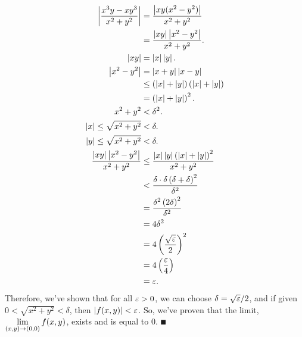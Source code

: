 \documentclass[a4paper, 11pt]{report}
\begin{document}
\begin{align*}
	\left| \frac{x^3y - xy^3}{x^2 + y^2} \right| &= \frac{\left| xy(x^2 - y^2) \right|}{x^2 + y^2} \\
		&= \frac{\left| xy \right|\left| x^2 - y^2 \right|}{x^2 + y^2}. \\
	\left| xy \right| &= \left| x \right|\left| y \right|. \\
	\left| x^2 - y^2 \right| &= \left| x + y \right|\left| x-y \right| \\
		&\leq \left( \left| x \right| + \left| y \right| \right)\left( \left| x \right| + \left| y \right| \right) \\
		&= \left( \left| x \right| + \left| y \right| \right)^2. \\
	x^2 + y^2 &< \delta^2. \\
	\left| x \right| \leq \sqrt{x^2 + y^2} &< \delta. \\
	\left| y \right| \leq \sqrt{x^2 + y^2} &< \delta. \\
	\frac{\left| xy \right|\left| x^2 - y^2 \right|}{x^2 + y^2} &\leq \frac{\left| x \right|\left| y \right|\left( \left| x \right| + \left| y \right| \right)^2}{x^2 + y^2} \\
		&< \frac{\delta\cdot\delta\left( \delta + \delta \right)^2}{\delta^2} \\
		&= \frac{\delta^2\left( 2\delta \right)^2}{\delta^2} \\
		&= 4\delta^2 \\
		&= 4\left( \frac{\sqrt{\varepsilon}}{2} \right)^2 \\
		&= 4\left( \frac{\varepsilon}{4} \right) \\
		&= \varepsilon.
\end{align*}
Therefore, we've shown that for all $\varepsilon>0$, we can choose $\delta=\sqrt{\varepsilon}/2$, and if given $0 < \sqrt{x^2+y^2} < \delta$, then $\left| f(x,y) \right|<\varepsilon$. So, we've proven that the limit, $\displaystyle{\lim_{(x,y)\to(0,0)}f(x,y)}$, exists and is equal to 0. $\QED$
\end{document}
